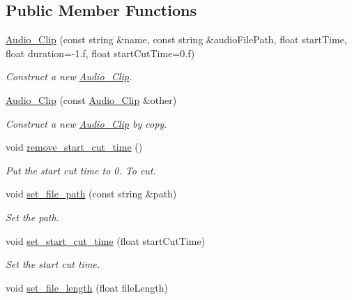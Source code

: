 \subsection*{Public Member Functions}
\begin{DoxyCompactItemize}
\item 
\mbox{\hyperlink{classprz_1_1_audio___clip_a61d02225b90c12fbba9df216df4d13cc}{Audio\+\_\+\+Clip}} (const string \&name, const string \&audio\+File\+Path, float start\+Time, float duration=-\/1.f, float start\+Cut\+Time=0.f)
\begin{DoxyCompactList}\small\item\em Construct a new \mbox{\hyperlink{classprz_1_1_audio___clip}{Audio\+\_\+\+Clip}}. \end{DoxyCompactList}\item 
\mbox{\hyperlink{classprz_1_1_audio___clip_ad5019492bd71d9ad0faad9e7d71609ca}{Audio\+\_\+\+Clip}} (const \mbox{\hyperlink{classprz_1_1_audio___clip}{Audio\+\_\+\+Clip}} \&other)
\begin{DoxyCompactList}\small\item\em Construct a new \mbox{\hyperlink{classprz_1_1_audio___clip}{Audio\+\_\+\+Clip}} by copy. \end{DoxyCompactList}\item 
void \mbox{\hyperlink{classprz_1_1_audio___clip_a07044f0528a26e2fe0afb5d7c645f13d}{remove\+\_\+start\+\_\+cut\+\_\+time}} ()
\begin{DoxyCompactList}\small\item\em Put the start cut time to 0. To cut. \end{DoxyCompactList}\item 
void \mbox{\hyperlink{classprz_1_1_audio___clip_aa098aaf21788bfdf5410cb1895566391}{set\+\_\+file\+\_\+path}} (const string \&path)
\begin{DoxyCompactList}\small\item\em Set the path. \end{DoxyCompactList}\item 
void \mbox{\hyperlink{classprz_1_1_audio___clip_ae2daaa8e064720fdecf051c63660edd5}{set\+\_\+start\+\_\+cut\+\_\+time}} (float start\+Cut\+Time)
\begin{DoxyCompactList}\small\item\em Set the start cut time. \end{DoxyCompactList}\item 
void \mbox{\hyperlink{classprz_1_1_audio___clip_ab45f2a30cf63261040e4212af3dc08d7}{set\+\_\+file\+\_\+length}} (float file\+Length)

\end{DoxyCompactItemize}
